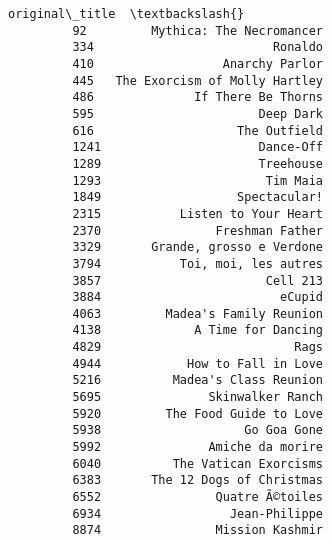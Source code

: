 \documentclass[11pt]{article}
\begin{document}
\begin{Verbatim}[commandchars=\\\{\}]
                              original\_title  \textbackslash{}
         92         Mythica: The Necromancer   
         334                         Ronaldo   
         410                  Anarchy Parlor   
         445   The Exorcism of Molly Hartley   
         486              If There Be Thorns   
         595                       Deep Dark   
         616                    The Outfield   
         1241                      Dance-Off   
         1289                      Treehouse   
         1293                       Tim Maia   
         1849                   Spectacular!   
         2315           Listen to Your Heart   
         2370                Freshman Father   
         3329       Grande, grosso e Verdone   
         3794           Toi, moi, les autres   
         3857                       Cell 213   
         3884                         eCupid   
         4063         Madea's Family Reunion   
         4138             A Time for Dancing   
         4829                           Rags   
         4944            How to Fall in Love   
         5216          Madea's Class Reunion   
         5695               Skinwalker Ranch   
         5920         The Food Guide to Love   
         5938                    Go Goa Gone   
         5992               Amiche da morire   
         6040          The Vatican Exorcisms   
         6383       The 12 Dogs of Christmas   
         6552                Quatre Ã©toiles   
         6934                  Jean-Philippe   
         8874                Mission Kashmir   
         

\end{Verbatim}
\end{document}
